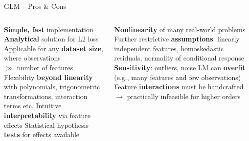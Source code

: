 
\begin{frame2}{GLM -- Pros \& Cons}

  \begin{columns}[onlytextwidth]
    \begin{column}{0.46\textwidth}
      
      \begin{procon}
        \setlength{\itemsep}{1pt}
        \setlength{\parskip}{1pt}
        \positem \textbf{Simple, fast} implementation
        \positem \textbf{Analytical} solution for L2 loss
        \positem Applicable for any \textbf{dataset size}, where 
        observations \\$\gg$ number of features
        \positem Flexibility \textbf{beyond linearity} with polynomials, 
        trigonometric transformations, interaction terms etc.
        \positem Intuitive \textbf{interpretability} via feature effects
        \positem Statistical hypothesis \textbf{tests} for effects available
      \end{procon}
    \end{column}
  
    \begin{column}{0.54\textwidth}
      
      \begin{itemize}
        \negitem \textbf{Nonlinearity} of many real-world problems
        \negitem Further restrictive \textbf{assumptions}: linearly independent 
        features, homoskedastic residuals, normality of conditional response 
        \negitem \textbf{Sensitivity}: outliers, noise
        \negitem LM can \textbf{overfit} (e.g., many features and few observations) 
        \negitem Feature \textbf{interactions} must be handcrafted\\
        $\rightarrow$ practically infeasible for higher orders
      \end{itemize}
    \end{column}
  \end{columns}
  
\end{frame2}
